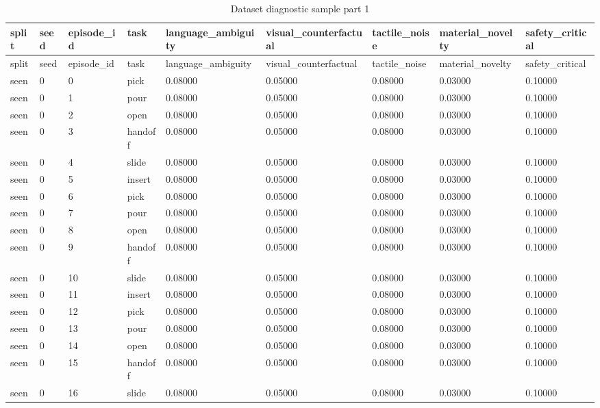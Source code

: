 \documentclass{article}
\begin{document}
\begin{center}
\tiny
\renewcommand{\arraystretch}{0.92}
\setlength{\tabcolsep}{3pt}
\begin{longtable}{lllllllll}
\caption{Dataset diagnostic sample part 1}\label{tab:dataset-diagnostic-sample-1}\\
\toprule
split & seed & episode\_id & task & language\_ambiguity & visual\_counterfactual & tactile\_noise & material\_novelty & safety\_critical \\
\midrule
\endfirsthead
\toprule
split & seed & episode\_id & task & language\_ambiguity & visual\_counterfactual & tactile\_noise & material\_novelty & safety\_critical \\
\midrule
\endhead
seen & 0 & 0 & pick & 0.08000 & 0.05000 & 0.08000 & 0.03000 & 0.10000 \\
seen & 0 & 1 & pour & 0.08000 & 0.05000 & 0.08000 & 0.03000 & 0.10000 \\
seen & 0 & 2 & open & 0.08000 & 0.05000 & 0.08000 & 0.03000 & 0.10000 \\
seen & 0 & 3 & handoff & 0.08000 & 0.05000 & 0.08000 & 0.03000 & 0.10000 \\
seen & 0 & 4 & slide & 0.08000 & 0.05000 & 0.08000 & 0.03000 & 0.10000 \\
seen & 0 & 5 & insert & 0.08000 & 0.05000 & 0.08000 & 0.03000 & 0.10000 \\
seen & 0 & 6 & pick & 0.08000 & 0.05000 & 0.08000 & 0.03000 & 0.10000 \\
seen & 0 & 7 & pour & 0.08000 & 0.05000 & 0.08000 & 0.03000 & 0.10000 \\
seen & 0 & 8 & open & 0.08000 & 0.05000 & 0.08000 & 0.03000 & 0.10000 \\
seen & 0 & 9 & handoff & 0.08000 & 0.05000 & 0.08000 & 0.03000 & 0.10000 \\
seen & 0 & 10 & slide & 0.08000 & 0.05000 & 0.08000 & 0.03000 & 0.10000 \\
seen & 0 & 11 & insert & 0.08000 & 0.05000 & 0.08000 & 0.03000 & 0.10000 \\
seen & 0 & 12 & pick & 0.08000 & 0.05000 & 0.08000 & 0.03000 & 0.10000 \\
seen & 0 & 13 & pour & 0.08000 & 0.05000 & 0.08000 & 0.03000 & 0.10000 \\
seen & 0 & 14 & open & 0.08000 & 0.05000 & 0.08000 & 0.03000 & 0.10000 \\
seen & 0 & 15 & handoff & 0.08000 & 0.05000 & 0.08000 & 0.03000 & 0.10000 \\
seen & 0 & 16 & slide & 0.08000 & 0.05000 & 0.08000 & 0.03000 & 0.10000 \\

\end{longtable}
\end{center}
\end{document}
